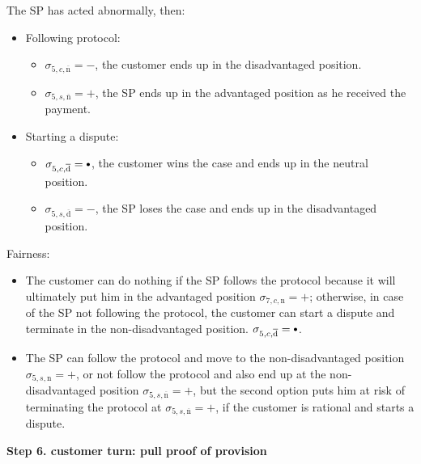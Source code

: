 \documentclass{ieeeaccess}
\newcommand\sbullet[1][.75]{\mathbin{\ThisStyle{\vcenter{\hbox{%
  \scalebox{#1}{$\SavedStyle\bullet$}}}}}%
}
\begin{document}
The SP has acted abnormally, then:

\begin{itemize}
\item
  Following protocol:

  \begin{itemize}
  
  \item
    \(\sigma_{5, c, \overline{\mathrm{n}}} = -\), the customer ends up in the disadvantaged position.
  \item
    \(\sigma_{5, s, \overline{\mathrm{n}}} = +\), the SP ends up in the advantaged position as he received the payment.
  \end{itemize}
\item
  Starting a dispute:

  \begin{itemize}
  
  \item
    \(\sigma_{5, c, \overline{\mathrm{d}}} = \sbullet\), the customer wins the case and ends up in the neutral position. 
  \item
    \(\sigma_{5, s, \overline{\mathrm{d}}} = -\), the SP loses the case and ends up in the disadvantaged position. 
  \end{itemize}
\end{itemize}

Fairness:

\begin{itemize}

\item
  The customer can do nothing if the SP follows the protocol because it will ultimately put him in the advantaged position \(\sigma_{7, c, \mathrm{n}} = +\); otherwise, in case of the SP not following the protocol, the customer can start a dispute and terminate in the non-disadvantaged position.
  \(\sigma_{5, c, \overline{\mathrm{d}}} = \sbullet\).
\item
  The SP can follow the protocol and move to the non-disadvantaged position \(\sigma_{5, s, \mathrm{n}} = +\), or not follow the protocol and also end up at the non-disadvantaged position \(\sigma_{5, s, \overline{\mathrm{n}}} = +\), but the second option puts him at risk of terminating the protocol at \(\sigma_{5, s, \overline{\mathrm{n}}} = +\), if the customer is rational and starts a dispute.
\end{itemize}


\noindent \textbf
{Step 6. customer turn: pull proof of provision}\label{step-6-pull-proof-of-provision}
\end{document}
